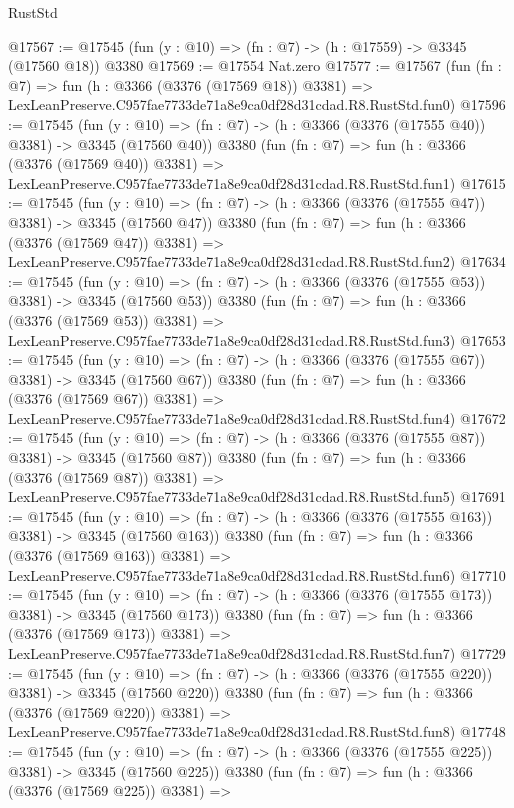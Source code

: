 \begin{lexlean}{RustStd}
\begin{coremodule}
@17567 := @17545 (fun (y : @10) => (fn : @7) -> (h : @17559) -> @3345 (@17560 @18)) @3380
@17569 := @17554 Nat.zero
@17577 := @17567
    (fun (fn : @7) =>
    fun (h : @3366 (@3376 (@17569 @18)) @3381) =>
    LexLeanPreserve.C957fae7733de71a8e9ca0df28d31cdad.R8.RustStd.fun0)
@17596 := @17545
    (fun (y : @10) => (fn : @7) -> (h : @3366 (@3376 (@17555 @40)) @3381) -> @3345 (@17560 @40))
    @3380
    (fun (fn : @7) =>
    fun (h : @3366 (@3376 (@17569 @40)) @3381) =>
    LexLeanPreserve.C957fae7733de71a8e9ca0df28d31cdad.R8.RustStd.fun1)
@17615 := @17545
    (fun (y : @10) => (fn : @7) -> (h : @3366 (@3376 (@17555 @47)) @3381) -> @3345 (@17560 @47))
    @3380
    (fun (fn : @7) =>
    fun (h : @3366 (@3376 (@17569 @47)) @3381) =>
    LexLeanPreserve.C957fae7733de71a8e9ca0df28d31cdad.R8.RustStd.fun2)
@17634 := @17545
    (fun (y : @10) => (fn : @7) -> (h : @3366 (@3376 (@17555 @53)) @3381) -> @3345 (@17560 @53))
    @3380
    (fun (fn : @7) =>
    fun (h : @3366 (@3376 (@17569 @53)) @3381) =>
    LexLeanPreserve.C957fae7733de71a8e9ca0df28d31cdad.R8.RustStd.fun3)
@17653 := @17545
    (fun (y : @10) => (fn : @7) -> (h : @3366 (@3376 (@17555 @67)) @3381) -> @3345 (@17560 @67))
    @3380
    (fun (fn : @7) =>
    fun (h : @3366 (@3376 (@17569 @67)) @3381) =>
    LexLeanPreserve.C957fae7733de71a8e9ca0df28d31cdad.R8.RustStd.fun4)
@17672 := @17545
    (fun (y : @10) => (fn : @7) -> (h : @3366 (@3376 (@17555 @87)) @3381) -> @3345 (@17560 @87))
    @3380
    (fun (fn : @7) =>
    fun (h : @3366 (@3376 (@17569 @87)) @3381) =>
    LexLeanPreserve.C957fae7733de71a8e9ca0df28d31cdad.R8.RustStd.fun5)
@17691 := @17545
    (fun (y : @10) => (fn : @7) -> (h : @3366 (@3376 (@17555 @163)) @3381) -> @3345 (@17560 @163))
    @3380
    (fun (fn : @7) =>
    fun (h : @3366 (@3376 (@17569 @163)) @3381) =>
    LexLeanPreserve.C957fae7733de71a8e9ca0df28d31cdad.R8.RustStd.fun6)
@17710 := @17545
    (fun (y : @10) => (fn : @7) -> (h : @3366 (@3376 (@17555 @173)) @3381) -> @3345 (@17560 @173))
    @3380
    (fun (fn : @7) =>
    fun (h : @3366 (@3376 (@17569 @173)) @3381) =>
    LexLeanPreserve.C957fae7733de71a8e9ca0df28d31cdad.R8.RustStd.fun7)
@17729 := @17545
    (fun (y : @10) => (fn : @7) -> (h : @3366 (@3376 (@17555 @220)) @3381) -> @3345 (@17560 @220))
    @3380
    (fun (fn : @7) =>
    fun (h : @3366 (@3376 (@17569 @220)) @3381) =>
    LexLeanPreserve.C957fae7733de71a8e9ca0df28d31cdad.R8.RustStd.fun8)
@17748 := @17545
    (fun (y : @10) => (fn : @7) -> (h : @3366 (@3376 (@17555 @225)) @3381) -> @3345 (@17560 @225))
    @3380
    (fun (fn : @7) =>
    fun (h : @3366 (@3376 (@17569 @225)) @3381) =>

\end{coremodule}
\end{lexlean}
